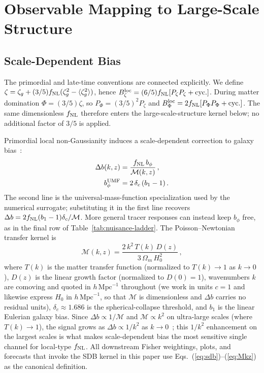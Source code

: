 \documentclass[aps,prd,twocolumn,superscriptaddress,showpacs,preprintnumbers,nofootinbib,longbibliography,floatfix]{revtex4-2}
\newcommand{\fnl}{f_{\rm NL}}
\begin{document}
\section{Observable Mapping to Large-Scale Structure}
\label{sec:lss}

\subsection{Scale-Dependent Bias}

The primordial and late-time conventions are connected explicitly. We define $\zeta=\zeta_g+(3/5)\fnl(\zeta_g^2-\langle\zeta_g^2\rangle)$, hence $B_\zeta^{\rm loc}=(6/5)\fnl[P_\zeta P_\zeta+{\rm cyc.}]$. During matter domination $\Phi=(3/5)\zeta$, so $P_\Phi=(3/5)^2P_\zeta$ and $B_\Phi^{\rm loc}=2\fnl[P_\Phi P_\Phi+{\rm cyc.}]$. The same dimensionless $\fnl$ therefore enters the large-scale-structure kernel below; no additional factor of $3/5$ is applied.

Primordial local non-Gaussianity induces a scale-dependent correction to galaxy bias~\cite{Dalal:2007cu,Slosar:2008}:
\begin{align}
\Delta b(k,z) &= \frac{\fnl\,b_\phi}{\mathcal{M}(k,z)}\,,
\label{eq:sdb}\\
b_\phi^{\rm UMF} &= 2\,\delta_c\,(b_1-1)\,.
\label{eq:bphi_umf}
\end{align}
The second line is the universal-mass-function specialization used by the numerical surrogate; substituting it in the first line recovers $\Delta b=2\fnl(b_1-1)\delta_c/\mathcal{M}$. More general tracer responses can instead keep $b_\phi$ free, as in the final row of Table~\ref{tab:nuisance-ladder}. The Poisson--Newtonian transfer kernel is
\begin{equation}
\mathcal{M}(k,z) = \frac{2\,k^2\,T(k)\,D(z)}{3\,\Omega_m\,H_0^2}\,,
\label{eq:Mkz}
\end{equation}
where $T(k)$ is the matter transfer function (normalized to $T(k)\to 1$ as $k\to 0$), $D(z)$ is the linear growth factor (normalized to $D(0)=1$), wavenumbers $k$ are comoving and quoted in $h\,\mathrm{Mpc}^{-1}$ throughout (we work in units $c=1$ and likewise express $H_0$ in $h\,\mathrm{Mpc}^{-1}$, so that $\mathcal{M}$ is dimensionless and $\Delta b$ carries no residual units), $\delta_c \approx 1.686$ is the spherical-collapse threshold, and $b_1$ is the linear Eulerian galaxy bias. Since $\Delta b \propto 1/\mathcal{M}$ and $\mathcal{M} \propto k^2$ on ultra-large scales (where $T(k)\to 1$), the signal grows as $\Delta b \propto 1/k^2$ as $k\to 0$~\cite{Dalal:2007cu,Slosar:2008}; this $1/k^2$ enhancement on the largest scales is what makes scale-dependent bias the most sensitive single channel for local-type $\fnl$. All downstream Fisher weightings, plots, and forecasts that invoke the SDB kernel in this paper use Eqs.~(\ref{eq:sdb})--(\ref{eq:Mkz}) as the canonical definition.
\end{document}
